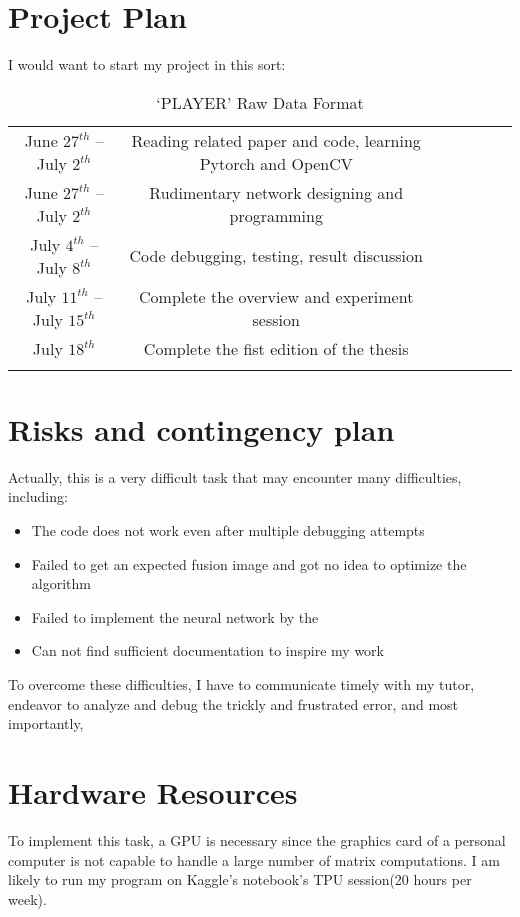 \documentclass[a4paper,12pt]{article}
\begin{document}
\section{Project Plan}
 
I would want to start my project in this sort:
\begin{table}[H]
	\centering
	\caption{‘PLAYER' Raw Data Format}
	\begin{tabular}{cccc ccc}

		\hline\hline\noalign{\smallskip}
        June $27^{th}$ -- July $2^{th}$ & Reading related paper and code, learning Pytorch and OpenCV &   \\
        \noalign{\smallskip}\hline\noalign{\smallskip}
		June $27^{th}$ -- July $2^{th}$ & Rudimentary network designing and programming &   \\
		\noalign{\smallskip}\hline\noalign{\smallskip}
        July $4^{th}$ -- July $8^{th}$ & Code debugging, testing, result discussion  &  \\
		\noalign{\smallskip}\hline{\smallskip}
        July $11^{th}$ -- July $15^{th}$ & Complete the overview and experiment session  &  \\
        \noalign{\smallskip}\hline{\smallskip}
        July $18^{th} $ & Complete the fist edition of the thesis  &  \\
        \noalign{\smallskip}\hline{\smallskip}
	\end{tabular}
\end{table}
\section{Risks and contingency plan}
Actually, this is a very difficult task that may encounter many difficulties, including:
\begin{itemize}
    \item The code does not work even after multiple debugging attempts
    \item Failed to get an expected fusion image and got no idea to optimize the algorithm
    \item Failed to implement the neural network by the 
    \item Can not find sufficient documentation to inspire my work
\end{itemize}

To overcome these difficulties, I have to communicate timely with my tutor, endeavor to analyze and debug the trickly and frustrated error, and most importantly, 
\section{Hardware Resources}
To implement this task, a GPU is necessary since the graphics card of a personal computer is not capable to handle a large number of matrix computations. I am likely to run my program on Kaggle's notebook's TPU session(20 hours per week).
\end{document}
